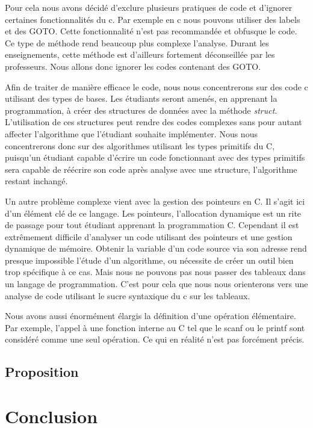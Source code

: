 \documentclass[12pt, twoside, openright]{report}
\begin{document}
Pour cela nous avons décidé d'exclure plusieurs pratiques de code et d'ignorer certaines fonctionnalités du c. Par exemple en c nous pouvons utiliser des labels et des GOTO. Cette fonctionnalité n'est pas recommandée et obfusque le code. Ce type de méthode rend beaucoup plus complexe l'analyse. Durant les enseignements, cette méthode est d'ailleurs fortement déconseillée par les professeurs. Nous allons donc ignorer les codes contenant des GOTO.

Afin de traiter de manière efficace le code, nous nous concentrerons sur des code c utilisant des types de bases. Les étudiants seront amenés, en apprenant la programmation, à créer des structures de données avec la méthode \textit{struct}. L'utilisation de ces structures peut rendre des codes complexes sans pour autant affecter l'algorithme que l'étudiant souhaite implémenter. Nous nous concentrerons donc sur des algorithmes utilisant les types primitifs du C, puisqu'un étudiant capable d'écrire un code fonctionnant avec des types primitifs sera capable de réécrire son code après analyse avec une structure, l'algorithme restant inchangé. 

Un autre problème complexe vient avec la gestion des pointeurs en C. Il s'agit ici d'un élément clé de ce langage. Les pointeurs, l'allocation dynamique est un rite de passage pour tout étudiant apprenant la programmation C. Cependant il est extrêmement difficile d'analyser un code utilisant des pointeurs et une gestion dynamique de mémoire. Obtenir la variable d'un code source via son adresse rend presque impossible l'étude d'un algorithme, ou nécessite de créer un outil bien trop spécifique à ce cas. Mais nous ne pouvons pas nous passer des tableaux dans un langage de programmation.  C'est pour cela que nous nous orienterons vers une analyse de code utilisant le sucre syntaxique du c sur les tableaux.

Nous avons aussi énormément élargis la définition d'une opération élémentaire. Par exemple, l'appel à une fonction interne au C tel que le scanf ou le printf sont considéré comme une seul opération. Ce qui en réalité n'est pas forcément précis.  

\section{Proposition}



\chapter{Conclusion}

\tableofcontents
\printbibliography
\end{document}
